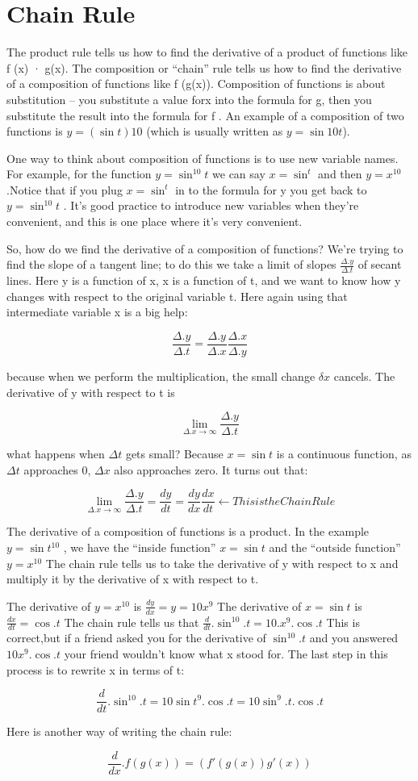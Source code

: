 \documentclass{book}
\begin{document}
\section*{Chain Rule} 

The product rule tells us how to find the derivative of a product of functions like f (x) · g(x). The composition or “chain” rule tells us how to find the derivative of a composition of functions like f (g(x)). Composition of functions is about substitution – you substitute a value forx into the formula for g, then you substitute the result into the formula for f . An example of a composition of two functions is $y = (\sin t)10$ (which is usually written as $y = \sin 10 t$).



One way to think about composition of functions is to use new variable names. For example, for the function
$y = \sin^{10} t$
we can say
$x = \sin^t$ 
and then 
$y = x^{10}$
.Notice that if you plug 
$x = \sin^t$ 
in to the formula for y you get back to 
$y = \sin^{10} t$
. It’s good practice to introduce new variables when they’re convenient, and this is one place where it’s very convenient. \par

So, how do we find the derivative of a composition of functions? We’re trying to find the slope of a tangent line; to do this we take a limit of slopes
$\frac{\Delta.y}{\Delta.t}$ 
of secant lines. Here y is a function of x, x is a function of t, and we want to know how y changes with respect to the original variable t. Here again using that intermediate variable x is a big help: \par

  
   $$\frac{\Delta.y}{\Delta.t}  = \frac{\Delta.y}{\Delta.x} \frac{\Delta.x}{\Delta.y}$$

because when we perform the multiplication, the small change $\delta x$ cancels.  The derivative of y with respect to t is

   $$\lim_{\Delta.x \to\infty}\frac{\Delta.y}{\Delta.t}$$

what happens when $\Delta t$ gets small? Because $x =\sin t$ is a continuous function, as $\Delta t$ approaches 0, $\Delta x$ also approaches zero.
It turns out that:

   $$\lim_{\Delta.x \to\infty}\frac{\Delta.y}{\Delta.t} = \frac{dy}{dt} = \frac{dy}{dx}\frac{dx}{dt}   \leftarrow  This is the Chain Rule $$   

                              
The derivative of a composition of functions is a product. In the example
$y = \sin t^{10}$
, we have the “inside function” $x = \sin t$ and the “outside function”
$y = x^{10}$
The chain rule tells us to take the derivative of y with respect to x and multiply it by the derivative of x with respect to t. \par
The derivative of
$y = x^{10}$
is
$\frac{dy}{dx} = y = 10x^9$
The derivative of $x = \sin t$ is
$\frac{dx}{dt} = \cos.t$
The chain rule tells us that
$\frac{d}{dt}.\sin^{10}.t = 10.x^9.\cos.t$
This is correct,but if a friend asked you for the derivative of
$\sin^{10}.t$ 
and you answered
$10x^9.\cos.t$
your friend wouldn’t know what x stood for. The last step in this process is to rewrite x in terms of t:
   
    $$\frac{d}{dt}.\sin^{10}.t  =  10\sin t^9.\cos.t = 10\sin ^9.t.\cos.t$$

Here is another way of writing the chain rule:
 
    $$\frac{d}{dx}.f(g(x)) = (f'(g(x))g'(x))$$
\end{document}
